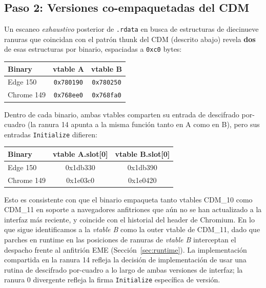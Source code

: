 \documentclass[11pt,letterpaper]{article}
\begin{document}
\subsection{Paso 2: Versiones co-empaquetadas del CDM}
\label{sec:static-versions}

Un escaneo \emph{exhaustivo} posterior de \texttt{.rdata} en
busca de estructuras de diecinueve ranuras que coincidan con el
patrón thunk del CDM (descrito abajo) revela \textbf{dos} de esas
estructuras por binario, espaciadas a \texttt{0xc0} bytes:

\begin{center}\small
\begin{tabular}{lcc}
\toprule
\textbf{Binary} & \textbf{vtable A} & \textbf{vtable B} \\
\midrule
Edge 150    & \texttt{0x780190} & \texttt{0x780250} \\
Chrome 149  & \texttt{0x768ee0} & \texttt{0x768fa0} \\
\bottomrule
\end{tabular}
\end{center}

Dentro de cada binario, ambas vtables comparten su entrada de
descifrado por-cuadro (la ranura 14 apunta a la misma función
tanto en A como en B), pero sus entradas \texttt{Initialize}
difieren:

\begin{center}\small
\begin{tabular}{lcc}
\toprule
\textbf{Binary} & \textbf{vtable A.slot[0]} & \textbf{vtable B.slot[0]} \\
\midrule
Edge 150    & 0x1db330 & 0x1db390 \\
Chrome 149  & 0x1e03c0 & 0x1e0420 \\
\bottomrule
\end{tabular}
\end{center}

Esto es consistente con que el binario empaqueta tanto vtables
CDM\_10 como CDM\_11 en soporte a navegadores anfitriones que aún
no se han actualizado a la interfaz más reciente, y coincide con
el historial del header de Chromium. En lo que sigue
identificamos a la \emph{vtable B} como la outer vtable de
CDM\_11, dado que parches en runtime en las posiciones de ranuras
de \emph{vtable B} interceptan el despacho frente al anfitrión
EME (Sección~\ref{sec:runtime}). La implementación compartida en
la ranura 14 refleja la decisión de implementación de usar una
rutina de descifrado por-cuadro a lo largo de ambas versiones de
interfaz; la ranura 0 divergente refleja la firma
\texttt{Initialize} específica de versión.
\end{document}

